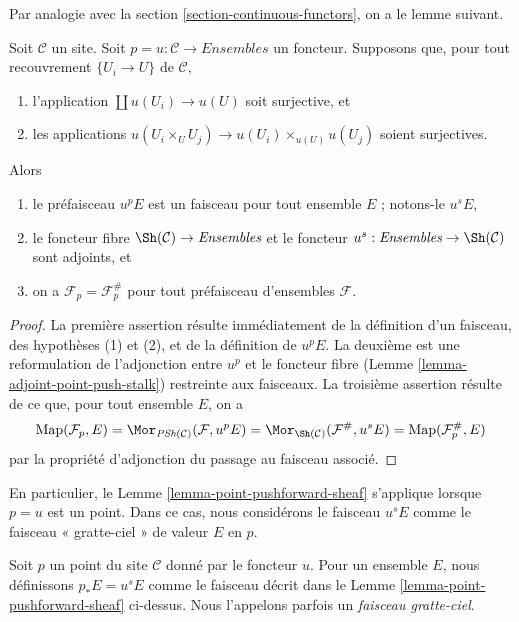 \noindent
Par analogie avec la section \ref{section-continuous-functors}, on a le lemme
suivant.

\begin{lemma}
\label{lemma-point-pushforward-sheaf}
Soit $\mathcal{C}$ un site. Soit
$p = u : \mathcal{C} \to \textit{Ensembles}$ un foncteur. Supposons que, pour tout
recouvrement $\{U_i \to U\}$ de $\mathcal{C}$,
\begin{enumerate}
\item l’application $\coprod u(U_i) \to u(U)$ soit surjective, et
\item les applications
$u(U_i \times_U U_j) \to u(U_i) \times_{u(U)} u(U_j)$ soient surjectives.
\end{enumerate}
Alors
\begin{enumerate}
\item le préfaisceau $u^pE$ est un faisceau pour tout ensemble $E$ ;
notons-le $u^sE$,
\item le foncteur fibre $\Sh(\mathcal{C}) \to \textit{Ensembles}$ et le foncteur
$u^s: \textit{Ensembles} \to \Sh(\mathcal{C})$ sont adjoints, et
\item on a $\mathcal{F}_p = \mathcal{F}^\#_p$ pour tout préfaisceau
d’ensembles $\mathcal{F}$.
\end{enumerate}
\end{lemma}

\begin{proof}
La première assertion résulte immédiatement de la définition d’un faisceau,
des hypothèses (1) et (2), et de la définition de $u^pE$. La deuxième est une
reformulation de l’adjonction entre $u^p$ et le foncteur fibre
(Lemme \ref{lemma-adjoint-point-push-stalk}) restreinte aux faisceaux.
La troisième assertion résulte de ce que, pour tout ensemble $E$, on a
$$
\text{Map}(\mathcal{F}_p, E) =
\Mor_{\textit{PSh}(\mathcal{C})}(\mathcal{F}, u^pE) =
\Mor_{\Sh(\mathcal{C})}(\mathcal{F}^\#, u^sE) =
\text{Map}(\mathcal{F}^\#_p, E)
$$
par la propriété d’adjonction du passage au faisceau associé.
\end{proof}

\noindent
En particulier, le Lemme \ref{lemma-point-pushforward-sheaf} s’applique
lorsque $p = u$ est un point. Dans ce cas, nous considérons le faisceau $u^sE$
comme le faisceau « gratte-ciel » de valeur $E$ en $p$.

\begin{definition}
\label{definition-pushforward-point}
Soit $p$ un point du site $\mathcal{C}$ donné par le foncteur $u$.
Pour un ensemble $E$, nous définissons $p_*E = u^sE$ comme le faisceau décrit
dans le Lemme \ref{lemma-point-pushforward-sheaf} ci-dessus.
Nous l’appelons parfois un {\it faisceau gratte-ciel}.
\end{definition}

